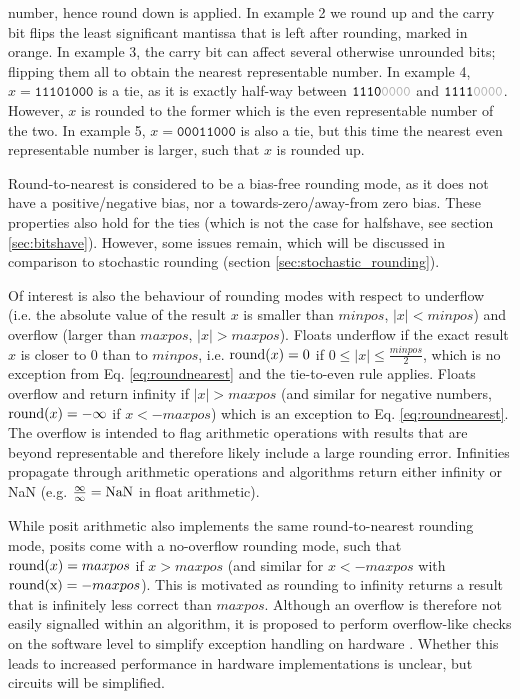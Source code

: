 number, hence round down is applied. In example 2 we round up and the carry bit flips the least significant mantissa that is
left after rounding, marked in orange. In example 3, the carry bit can affect several otherwise unrounded bits; flipping them
all to obtain the nearest representable number. In example 4, $x = \mathtt{11101000}$ is a tie, as it is exactly half-way between
$\mathtt{1110{\color{gray}0000}}$ and $\mathtt{1111{\color{gray}0000}}$. However, $x$ is rounded to the former which is the
even representable number of the two. In example 5,  $x = \mathtt{00011000}$ is also a tie, but this time the nearest even
representable number is larger, such that $x$ is rounded up.

Round-to-nearest is considered to be a bias-free rounding mode, as it does not have a positive/negative bias, nor a 
towards-zero/away-from zero bias. These properties also hold for the ties (which is not the case for halfshave,
see section \ref{sec:bitshave}). However, some issues remain, which will be discussed in comparison to stochastic rounding
(section \ref{sec:stochastic_rounding}).

Of interest is also the behaviour of rounding modes with respect to underflow (i.e. the absolute value of the result $x$
is smaller than $minpos$, $\vert x \vert < minpos$) and overflow (larger than $maxpos$, $\vert x \vert > maxpos$).
Floats underflow if the exact result $x$ is closer to 0 than to $minpos$, i.e. $\operatorname{round}(x) = 0$ if
$0 \leq \vert x \vert \leq \tfrac{minpos}{2}$, which is no exception from Eq. \ref{eq:roundnearest} and the tie-to-even rule
applies. Floats overflow and return infinity if $\vert x \vert > maxpos$ (and similar for negative numbers,
$\operatorname{round}(x) = -\infty$ if $x < -maxpos$) which is an exception to Eq. \ref{eq:roundnearest}. The overflow is
intended to flag arithmetic operations with results that are beyond representable and therefore likely include a large
rounding error. Infinities propagate through arithmetic operations and algorithms return either infinity or NaN
(e.g. $\tfrac{\infty}{\infty} = \operatorname{NaN}$ in float arithmetic).

While posit arithmetic also implements the same round-to-nearest rounding mode, posits come with a no-overflow
rounding mode, such that $\operatorname{round}(x) = maxpos$ if $x > maxpos$ (and similar for $x< -maxpos$ with $\operatorname{round(x)} = -maxpos$).
This is motivated as rounding to infinity returns a result that is infinitely less correct than $maxpos$. Although an overflow
is therefore not easily signalled within an algorithm, it is proposed to perform overflow-like checks on the software level
to simplify exception handling on hardware \citep{Gustafson2017a}. Whether this leads to increased performance in
hardware implementations is unclear, but circuits will be simplified.

